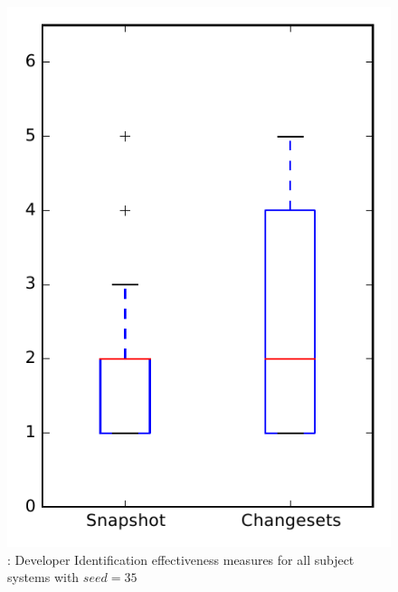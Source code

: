 
\begin{figure}
\centering
\includegraphics[height=0.4\textheight]{figures/dit_seed/rq1_overview_35}
\caption{\rtwo: Developer Identification effectiveness measures for all subject systems with $seed=35$}
\label{fig:dit_seed:rq1:overview}
\end{figure}
